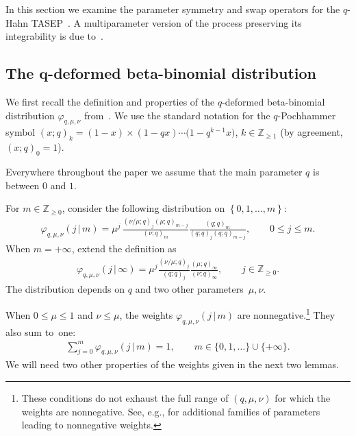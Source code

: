 \documentclass[11pt]{article}
\numberwithin{equation}{section}
\numberwithin{equation}{section}
\begin{document}
{\sloppy
In this section we examine the parameter symmetry and swap operators for the
$q$-Hahn TASEP~\cite{Povolotsky2013}.
A multiparameter version of the process
preserving its integrability is due to~\cite{BorodinPetrov2016inhom}.

}

\subsection[The q-deformed beta-binomial distribution]
{The $\boldsymbol q$-deformed beta-binomial distribution}\label{sub:phi_distribution}

We first recall the definition and properties of
the $q$-deformed beta-binomial distribution
$\varphi_{q,\mu,\nu}$ from~\cite{Corwin2014qmunu, Povolotsky2013}.
We use the standard notation for the $q$-Pochhammer symbol
$(x;q)_k=(1-x)\times(1-qx)\cdots\big(1-q^{k-1}x\big)$, $k\in \mathbb{Z}_{\ge1}$
(by agreement, $(x;q)_0=1$).

Everywhere throughout the paper we
assume that the main parameter $q$ is between $0$ and $1$.

\begin{Definition}
	\label{def:phi_distribution}
	For $m\in \mathbb{Z}_{\ge0}$, consider the following distribution on
	$\left\{ 0,1,\ldots,m \right\}$:
	\begin{gather*}
		\varphi_{q,\mu,\nu}(j\,|\, m)=
		\mu^j\,\frac{(\nu/\mu;q)_j(\mu;q)_{m-j}}{(\nu;q)_m}
		\frac{(q;q)_m}{(q;q)_j(q;q)_{m-j}},
		\qquad
		0\le j\le m.
	\end{gather*}
	When $m=+\infty$, extend the definition as
	\begin{gather*}
		\varphi_{q,\mu,\nu}(j\,|\, \infty)=
		\mu^j\frac{(\nu/\mu;q)_j}{(q;q)_j}\frac{(\mu;q)_\infty}{(\nu;q)_\infty},
		\qquad
		j\in \mathbb{Z}_{\ge0}.
	\end{gather*}
	The distribution depends on $q$
	and two other parameters~$\mu,\nu$.
\end{Definition}

When $0\le \mu\le 1$ and $\nu\le \mu$, the weights $\varphi_{q,\mu,\nu}(j\,|\, m)$
are nonnegative.\footnote{These conditions do not
exhaust the full range of $(q,\mu,\nu)$
for which the weights are nonnegative.
See, e.g., \cite[Section 6.6.1]{BorodinPetrov2016inhom}
for additional families of parameters leading to nonnegative weights.}
They also sum to~one:
\begin{gather*}
\sum_{j=0}^{m}\varphi_{q,\mu,\nu}(j\,|\, m)=1,\qquad m\in\{ 0,1,\ldots \}
\cup\{ +\infty \}.
\end{gather*}
We will need two other properties of the weights given in the next
two lemmas.
\end{document}
